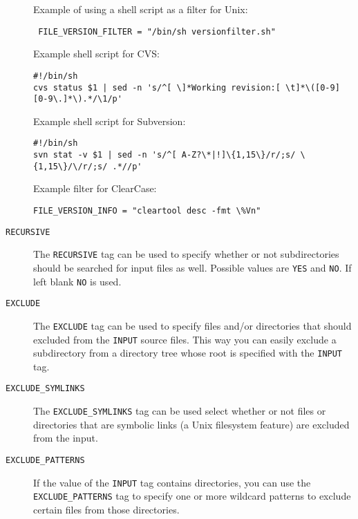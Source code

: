 \begin{description}
Example of using a shell script as a filter for Unix: 

\footnotesize\begin{verbatim}
 FILE_VERSION_FILTER = "/bin/sh versionfilter.sh"
\end{verbatim}
\normalsize


Example shell script for CVS: 

\footnotesize\begin{verbatim}
#!/bin/sh
cvs status $1 | sed -n 's/^[ \]*Working revision:[ \t]*\([0-9][0-9\.]*\).*/\1/p'
\end{verbatim}
\normalsize


Example shell script for Subversion: 

\footnotesize\begin{verbatim}
#!/bin/sh
svn stat -v $1 | sed -n 's/^[ A-Z?\*|!]\{1,15\}/r/;s/ \{1,15\}/\/r/;s/ .*//p'
\end{verbatim}
\normalsize


Example filter for ClearCase: 

\footnotesize\begin{verbatim}
FILE_VERSION_INFO = "cleartool desc -fmt \%Vn"
\end{verbatim}
\normalsize


\label{config_cfg_recursive}
\hypertarget{config_cfg_recursive}{}
 \item[{\tt RECURSIVE} ] The {\tt RECURSIVE} tag can be used to specify whether or not subdirectories should be searched for input files as well. Possible values are {\tt YES} and {\tt NO}. If left blank {\tt NO} is used.

\label{config_cfg_exclude}
\hypertarget{config_cfg_exclude}{}
 \item[{\tt EXCLUDE} ] The {\tt EXCLUDE} tag can be used to specify files and/or directories that should excluded from the {\tt INPUT} source files. This way you can easily exclude a subdirectory from a directory tree whose root is specified with the {\tt INPUT} tag.

\label{config_cfg_exclude_symlinks}
\hypertarget{config_cfg_exclude_symlinks}{}
 \item[{\tt EXCLUDE\_\-SYMLINKS} ] The {\tt EXCLUDE\_\-SYMLINKS} tag can be used select whether or not files or directories that are symbolic links (a Unix filesystem feature) are excluded from the input.

\label{config_cfg_exclude_patterns}
\hypertarget{config_cfg_exclude_patterns}{}
 \item[{\tt EXCLUDE\_\-PATTERNS} ] If the value of the {\tt INPUT} tag contains directories, you can use the {\tt EXCLUDE\_\-PATTERNS} tag to specify one or more wildcard patterns to exclude certain files from those directories.


\end{description}
